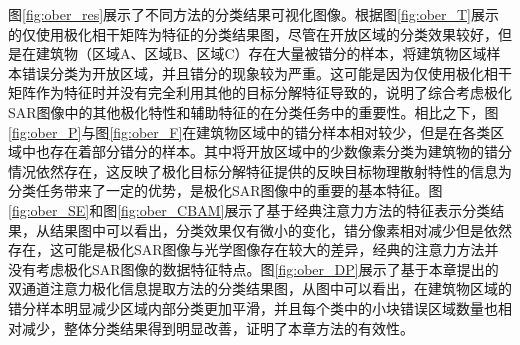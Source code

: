 图\ref{fig:ober_res}展示了不同方法的分类结果可视化图像。根据图\ref{fig:ober_T}展示的仅使用极化相干矩阵为特征的分类结果图，尽管在开放区域的分类效果较好，但是在建筑物（区域A、区域B、区域C）存在大量被错分的样本，将建筑物区域样本错误分类为开放区域，并且错分的现象较为严重。这可能是因为仅使用极化相干矩阵作为特征时并没有完全利用其他的目标分解特征导致的，说明了综合考虑极化SAR图像中的其他极化特性和辅助特征的在分类任务中的重要性。相比之下，图\ref{fig:ober_P}与图\ref{fig:ober_F}在建筑物区域中的错分样本相对较少，但是在各类区域中也存在着部分错分的样本。其中将开放区域中的少数像素分类为建筑物的错分情况依然存在，这反映了极化目标分解特征提供的反映目标物理散射特性的信息为分类任务带来了一定的优势，是极化SAR图像中的重要的基本特征。图\ref{fig:ober_SE}和图\ref{fig:ober_CBAM}展示了基于经典注意力方法的特征表示分类结果，从结果图中可以看出，分类效果仅有微小的变化，错分像素相对减少但是依然存在，这可能是极化SAR图像与光学图像存在较大的差异，经典的注意力方法并没有考虑极化SAR图像的数据特征特点。图\ref{fig:ober_DP}展示了基于本章提出的双通道注意力极化信息提取方法的分类结果图，从图中可以看出，在建筑物区域的错分样本明显减少区域内部分类更加平滑，并且每个类中的小块错误区域数量也相对减少，整体分类结果得到明显改善，证明了本章方法的有效性。

